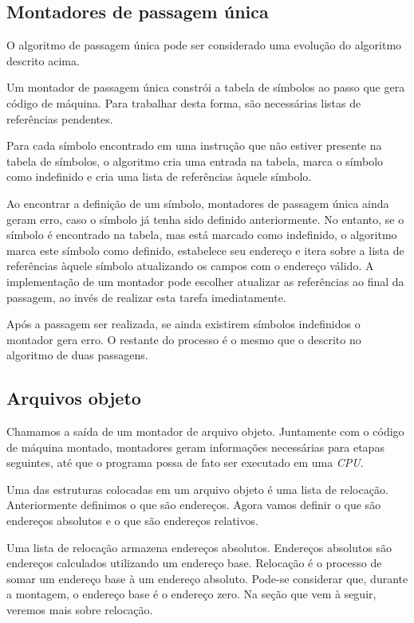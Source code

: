 \subsection{Montadores de passagem única}

O algoritmo de passagem única pode ser considerado uma evolução do algoritmo descrito acima.

Um montador de passagem única constrói a tabela de símbolos ao passo que gera código de máquina. Para trabalhar desta forma, são necessárias listas de referências pendentes.

Para cada símbolo encontrado em uma instrução que não estiver presente na tabela de símbolos, o algoritmo cria uma entrada na tabela, marca o símbolo como indefinido e cria uma lista de referências àquele símbolo.

Ao encontrar a definição de um símbolo, montadores de passagem única ainda geram erro, caso o símbolo já tenha sido definido anteriormente. No entanto, se o símbolo é encontrado na tabela, mas está marcado como indefinido, o algoritmo marca este símbolo como definido, estabelece seu endereço e itera sobre a lista de referências àquele símbolo atualizando os campos com o endereço válido. A implementação de um montador pode escolher atualizar as referências ao final da passagem, ao invés de realizar esta tarefa imediatamente.

Após a passagem ser realizada, se ainda existirem símbolos indefinidos o montador gera erro. O restante do processo é o mesmo que o descrito no algoritmo de duas passagens.

\subsection{Arquivos objeto}

Chamamos a saída de um montador de arquivo objeto. Juntamente com o código de máquina montado, montadores geram informações necessárias para etapas seguintes, até que o programa possa de fato ser executado em uma \textit{CPU}.

Uma das estruturas colocadas em um arquivo objeto é uma lista de relocação. Anteriormente definimos o que são endereços. Agora vamos definir o que são endereços absolutos e o que são endereços relativos.

Uma lista de relocação armazena endereços absolutos. Endereços absolutos são endereços calculados utilizando um endereço base. Relocação é o processo de somar um endereço base à um endereço absoluto. Pode-se considerar que, durante a montagem, o endereço base é o endereço zero. Na seção que vem à seguir, veremos mais sobre relocação.

